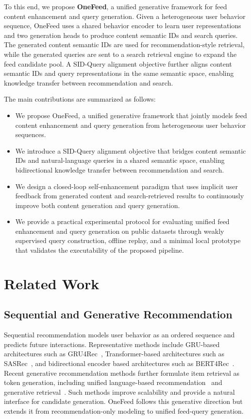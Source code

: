 \documentclass[11pt]{article}
\begin{document}
To this end, we propose \textbf{OneFeed}, a unified generative framework for feed content enhancement and query generation. Given a heterogeneous user behavior sequence, OneFeed uses a shared behavior encoder to learn user representations and two generation heads to produce content semantic IDs and search queries. The generated content semantic IDs are used for recommendation-style retrieval, while the generated queries are sent to a search retrieval engine to expand the feed candidate pool. A SID-Query alignment objective further aligns content semantic IDs and query representations in the same semantic space, enabling knowledge transfer between recommendation and search.

The main contributions are summarized as follows:

\begin{itemize}
    \item We propose OneFeed, a unified generative framework that jointly models feed content enhancement and query generation from heterogeneous user behavior sequences.
    \item We introduce a SID-Query alignment objective that bridges content semantic IDs and natural-language queries in a shared semantic space, enabling bidirectional knowledge transfer between recommendation and search.
    \item We design a closed-loop self-enhancement paradigm that uses implicit user feedback from generated content and search-retrieved results to continuously improve both content generation and query generation.
    \item We provide a practical experimental protocol for evaluating unified feed enhancement and query generation on public datasets through weakly supervised query construction, offline replay, and a minimal local prototype that validates the executability of the proposed pipeline.
\end{itemize}

\section{Related Work}

\subsection{Sequential and Generative Recommendation}

Sequential recommendation models user behavior as an ordered sequence and predicts future interactions. Representative methods include GRU-based architectures such as GRU4Rec~\cite{hidasi2016gru4rec}, Transformer-based architectures such as SASRec~\cite{kang2018sasrec}, and bidirectional encoder based architectures such as BERT4Rec~\cite{sun2019bert4rec}. Recent generative recommendation methods further formulate item retrieval as token generation, including unified language-based recommendation~\cite{geng2022p5} and generative retrieval~\cite{rajput2024tiger}. Such methods improve scalability and provide a natural interface for candidate generation. OneFeed follows this generative direction but extends it from recommendation-only modeling to unified feed-query generation.
\end{document}
